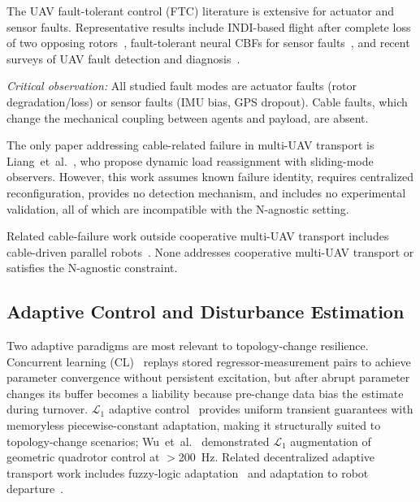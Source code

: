 The UAV fault-tolerant control (FTC) literature is extensive for actuator and sensor faults. Representative results include INDI-based flight after complete loss of two opposing rotors~\cite{sun2020incremental}, fault-tolerant neural CBFs for sensor faults~\cite{zhang2024fault}, and recent surveys of UAV fault detection and diagnosis~\cite{adaika2025fdd}.

\emph{Critical observation:} All studied fault modes are actuator faults (rotor degradation/loss) or sensor faults (IMU bias, GPS dropout). Cable faults, which change the mechanical coupling between agents and payload, are absent.

The only paper addressing cable-related failure in multi-UAV transport is Liang~et~al.~\cite{liang2021fault}, who propose dynamic load reassignment with sliding-mode observers. However, this work assumes known failure identity, requires centralized reconfiguration, provides no detection mechanism, and includes no experimental validation, all of which are incompatible with the N-agnostic setting.

Related cable-failure work outside cooperative multi-UAV transport includes cable-driven parallel robots~\cite{raman2023cable}. None addresses cooperative multi-UAV transport or satisfies the N-agnostic constraint.

\subsection{Adaptive Control and Disturbance Estimation}
\label{sec:rw_adaptive}

Two adaptive paradigms are most relevant to topology-change resilience. Concurrent learning (CL)~\cite{chowdhary2010concurrent,chowdhary2015concurrent} replays stored regressor-measurement pairs to achieve parameter convergence without persistent excitation, but after abrupt parameter changes its buffer becomes a liability because pre-change data bias the estimate during turnover. $\mathcal{L}_1$ adaptive control~\cite{cao2010l1book,cao2010stability} provides uniform transient guarantees with memoryless piecewise-constant adaptation, making it structurally suited to topology-change scenarios; Wu~et~al.~\cite{wu2025l1quad} demonstrated $\mathcal{L}_1$ augmentation of geometric quadrotor control at $>$200~Hz. Related decentralized adaptive transport work includes fuzzy-logic adaptation~\cite{barawkar2024decentralized} and adaptation to robot departure~\cite{gao2024decentralized}.

